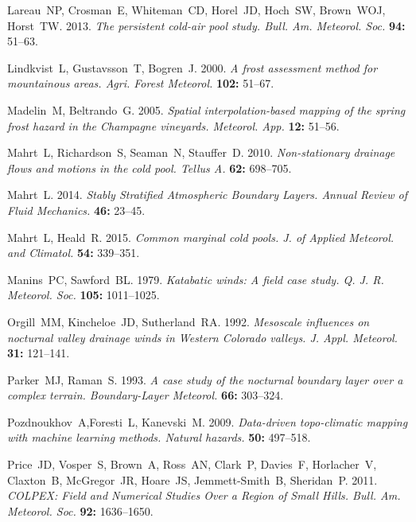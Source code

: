 \documentclass[times]{qjrms4}
\begin{document}
\begin{thebibliography}{99}
Lareau~NP, Crosman~E, Whiteman~CD, Horel~JD, Hoch~SW, Brown~WOJ, Horst~TW. 2013. \emph{The persistent cold-air pool study. Bull. Am. Meteorol. Soc.} {\bf 94:} 51--63.

Lindkvist~L, Gustavsson~T, Bogren~J. 2000. \emph{A frost assessment method for mountainous areas. Agri. Forest Meteorol.} {\bf 102:} 51--67.

Madelin~M, Beltrando~G. 2005. \emph{Spatial interpolation-based mapping of the spring frost hazard in the Champagne vineyards. Meteorol. App.} {\bf 12:} 51--56.

Mahrt~L, Richardson~S, Seaman~N, Stauffer~D. 2010. \emph{Non-stationary drainage flows and motions in the cold pool. Tellus A.} {\bf 62:} 698--705.

Mahrt~L. 2014. \emph{Stably Stratified Atmospheric Boundary Layers. Annual Review of Fluid Mechanics.} {\bf 46:} 23--45.

Mahrt~L, Heald~R. 2015. \emph{Common marginal cold pools. J. of Applied Meteorol. and Climatol.} {\bf 54:} 339--351.

Manins~PC, Sawford~BL. 1979. \emph{Katabatic winds: A field case study. Q. J. R. Meteorol. Soc.} {\bf 105:} 1011--1025.

Orgill~MM, Kincheloe~JD, Sutherland~RA. 1992. \emph{Mesoscale influences on nocturnal valley drainage winds in Western Colorado valleys. J. Appl. Meteorol.} {\bf 31:} 121--141.

Parker~MJ, Raman~S. 1993. \emph{A case study of the nocturnal boundary layer over a complex terrain. Boundary-Layer Meteorol.} {\bf 66:} 303--324.

Pozdnoukhov~A,Foresti~L, Kanevski~M. 2009. \emph{Data-driven topo-climatic mapping with machine learning methods. Natural hazards.} {\bf 50:} 497--518. 

Price~JD, Vosper~S, Brown~A, Ross~AN, Clark~P, Davies~F, Horlacher~V, Claxton~B, McGregor~JR, Hoare~JS, Jemmett-Smith~B, Sheridan~P. 2011. \emph{COLPEX: Field and Numerical Studies Over a Region of Small Hills. Bull. Am. Meteorol. Soc.} {\bf 92:} 1636--1650.


\end{thebibliography}
\end{document}
